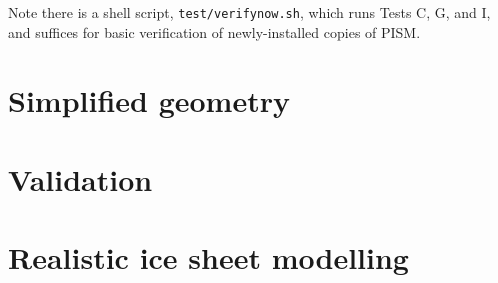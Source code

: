 \documentclass[11pt,final]{amsart}
\begin{document}
Note there is a shell script, \verb|test/verifynow.sh|, which runs Tests C, G, and I, and suffices for basic verification of newly-installed copies of PISM.




\section{Simplified geometry}


\section{Validation}


\section{Realistic ice sheet modelling}
\end{document}
